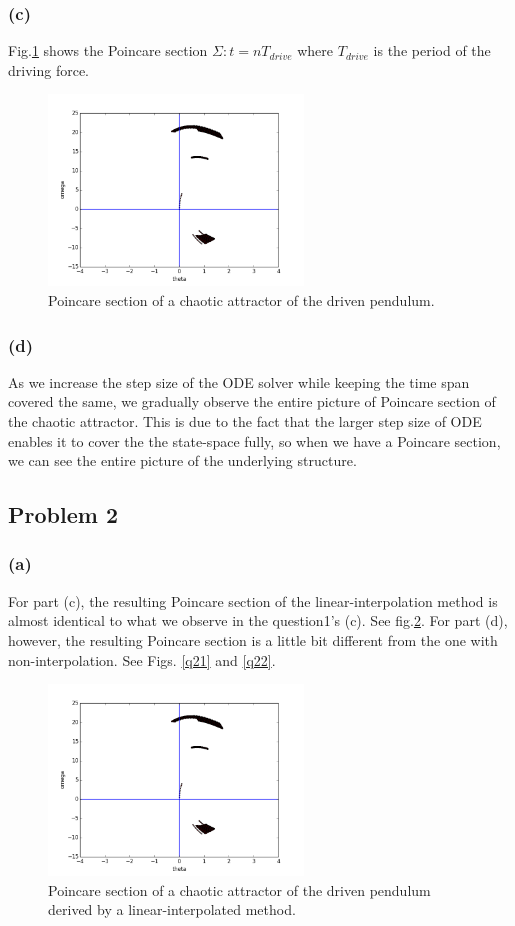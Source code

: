 \documentclass{article}
\begin{document}
\subsubsection*{(c)}
Fig.\ref{q1c} shows the Poincare section $\Sigma:t = nT_{drive}$ where $T_{drive}$ is the period of the driving force. 

\begin{figure}[h]
  \centering
  \includegraphics[height=2in]{figs/q1/q1c_delta_t_0005.png}
  \caption{Poincare section of a chaotic attractor of the driven pendulum.}
  \label{q1c}
\end{figure}

\subsubsection*{(d)}
As we increase the step size of the ODE solver while keeping the time span covered the same, we gradually observe the entire picture of Poincare section of the chaotic attractor. This is due to the fact that the larger step size of ODE enables it to cover the the state-space fully, so when we have a Poincare section, we can see the entire picture of the underlying structure. 

\subsection*{Problem 2}
\subsubsection*{(a)}
For part (c), the resulting Poincare section of the linear-interpolation method is almost identical to what we observe in the question1's (c). See fig.\ref{q2c}. For part (d), however, the resulting Poincare section is a little bit different from the one with non-interpolation. See Figs. \ref{q21} and \ref{q22}.

\begin{figure}[h]
  \centering
  \includegraphics[height=2in]{figs/q2/c.png}
  \caption{Poincare section of a chaotic attractor of the driven pendulum derived by a linear-interpolated method.}
  \label{q2c}
\end{figure}
\end{document}
